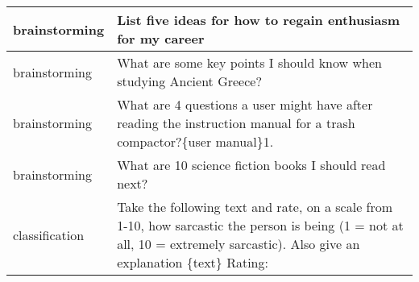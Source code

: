 \begin{longtable}{p{} p{}}
\bottomrule
\endlastfoot
 brainstorming &                                                                                                                                                                                                                                                                                                                                                                   List five ideas for how to regain enthusiasm for my career \\ \midrule
 brainstorming &                                                                                                                                                                                                                                                                                                                                                         What are some key points I should know when studying Ancient Greece? \\ \midrule
 brainstorming &                                                                                                                                                                                                                                                                                                    What are 4 questions a user might have after reading the instruction manual for a trash compactor?{\newline}{\newline}\{user manual\}{\newline}{\newline}1. \\ \midrule
 brainstorming &                                                                                                                                                                                                                                                                                                                                                                        What are 10 science fiction books I should read next? \\ \midrule
classification &                                                                                                                                                                                                                                  Take the following text and rate, on a scale from 1-10, how sarcastic the person is being (1 = not at all, 10 = extremely sarcastic). Also give an explanation{\newline} {\newline}{\newline} \{text\}{\newline} {\newline}{\newline} Rating: \\ \midrule

\end{longtable}
